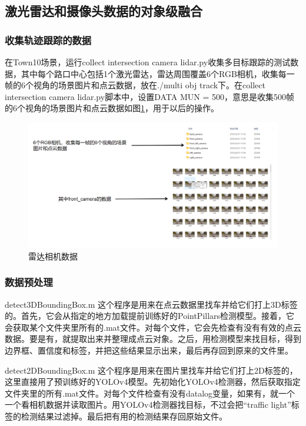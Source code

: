 \subsection{激光雷达和摄像头数据的对象级融合}
\subsubsection{收集轨迹跟踪的数据}
在Town10场景，运行collect intersection camera lidar.py收集多目标跟踪的测试数据，其中每个路口中心包括1个激光雷达，雷达周围覆盖6个RGB相机，收集每一帧的6个视角的场景图片和点云数据，放在./multi obj track下。在collect intersection camera lidar.py脚本中，设置DATA MUN = 500，意思是收集500帧的6个视角的场景图片和点云数据如图\ref{fig:p12}，用于以后的操作。



\begin{figure}[htbp] %
	\centering
	\includegraphics[width=1\textwidth]{p12} %
	\caption{雷达相机数据} %
	\label{fig:p12} %
\end{figure}



\subsubsection{数据预处理}


detect3DBoundingBox.m 这个程序是用来在点云数据里找车并给它们打上3D标签的。首先，它会从指定的地方加载提前训练好的PointPillars检测模型。接着，它会获取某个文件夹里所有的.mat文件。对每个文件，它会先检查有没有有效的点云数据。要是有，就提取出来并整理成点云对象。之后，用检测模型来找目标，得到边界框、置信度和标签，并把这些结果显示出来，最后再存回到原来的文件里。

detect2DBoundingBox.m 这个程序是用来在图片里找车并给它们打上2D标签的，这里直接用了预训练好的YOLOv4模型。先初始化YOLOv4检测器，然后获取指定文件夹里的所有.mat文件。对每个文件检查有没有datalog变量，如果有，就一个一个看相机数据并读取图片。用YOLOv4检测器找目标，不过会把“traffic light”标签的检测结果过滤掉。最后把有用的检测结果存回原始文件。



